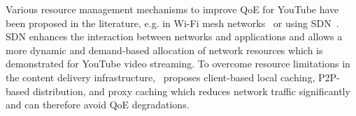Various resource management mechanisms to improve \gls{QoE} for YouTube have been proposed in the literature, e.g. in Wi-Fi mesh networks~\cite{Wamser2013} or using \gls{SDN}~\cite{Zinner2014}.
\gls{SDN} enhances the interaction between networks and applications and allows a more dynamic and demand-based allocation of network resources which is demonstrated for YouTube video streaming.
To overcome resource limitations in the content delivery infrastructure,~\cite{Zink2008} proposes client-based local caching, \gls{P2P}-based distribution, and proxy caching which reduces network traffic significantly and can therefore avoid \gls{QoE} degradations.
